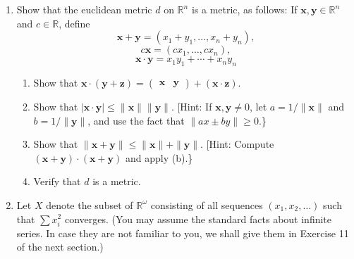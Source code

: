 \begin{enumerate}[itemsep=0.4em, parsep=0pt, topsep=0pt, partopsep=0pt, leftmargin=*, label=\arabic*., ref=\arabic*]
  \begin{enumerate}[itemsep=0.2em, parsep=0pt, topsep=0pt, partopsep=0pt, leftmargin=*, label=(\alph*), align=left]
  \item Show that on \(X\), we have the inclusions \[ \text{ box topology } \supset {\ell }^{2}\text{ -topology } \supset \text{ uniform topology. } \]
  \item The set \(\mathbb{R}^{\infty }\) of all sequences that are eventually zero is contained in \(X\). Show that the four topologies that \(\mathbb{R}^{\infty }\) inherits as a subspace of \(X\) are all distinct.
  \item The set \[ H = \mathop{\prod }\limits_{{n \in {\mathbb{Z}}_{ + }}}[ {0,1/n}] \] is contained in \(X\), it is called the Hilbert cube. Compare the four topologies that \(H\) inherits as a subspace of \(X\).
  \end{enumerate}
\item Show that the euclidean metric \(d\) on \(\mathbb{R}^{n}\) is a metric, as follows: If \(\mathbf{x},\mathbf{y} \in {\mathbb{R}}^{n}\) and \(c \in \mathbb{R}\), define \[ \mathbf{x} + \mathbf{y} = ( {x_{1} + y_{1},\ldots,x_{n} + y_{n}}), \] \[ c\mathbf{x} = ( {cx_{1},\ldots,cx_{n}}), \] \[ \mathbf{x} \cdot \mathbf{y} = x_{1}y_{1} + \cdots + x_{n}y_{n} \]
  \begin{enumerate}[itemsep=0.2em, parsep=0pt, topsep=0pt, partopsep=0pt, leftmargin=*, label=(\alph*), align=left]
  \item Show that \(\mathbf{x} \cdot ( {\mathbf{y} + \mathbf{z}}) = ( \begin{array}{ll} \mathbf{x} & \mathbf{y} \end{array}) + ( {\mathbf{x} \cdot \mathbf{z}})\).
  \item Show that \(| {\mathbf{x} \cdot \mathbf{y}}| \leq \parallel \mathbf{x}\parallel \parallel \mathbf{y}\parallel\). [Hint: If \(\mathbf{x},\mathbf{y} \neq 0\), let \(a = 1/\parallel \mathbf{x}\parallel\) and \(b = 1/\parallel \mathbf{y}\parallel\), and use the fact that \(\parallel {ax} \pm {by}\parallel \geq 0\).\}
  \item Show that \(\parallel \mathbf{x} + \mathbf{y}\parallel \leq \parallel \mathbf{x}\parallel + \parallel \mathbf{y}\parallel\). [Hint: Compute \(( {\mathbf{x} + \mathbf{y}}) \cdot ( {\mathbf{x} + \mathbf{y}})\) and apply (b).\}
  \item Verify that \(d\) is a metric.
  \end{enumerate}
\item Let \(X\) denote the subset of \(\mathbb{R}^{\omega }\) consisting of all sequences \(( {x_{1},x_{2},\ldots })\) such that \(\sum {x}_i^{2}\) converges. (You may assume the standard facts about infinite series. In case they are not familiar to you, we shall give them in Exercise 11 of the next section.)

\end{enumerate}
